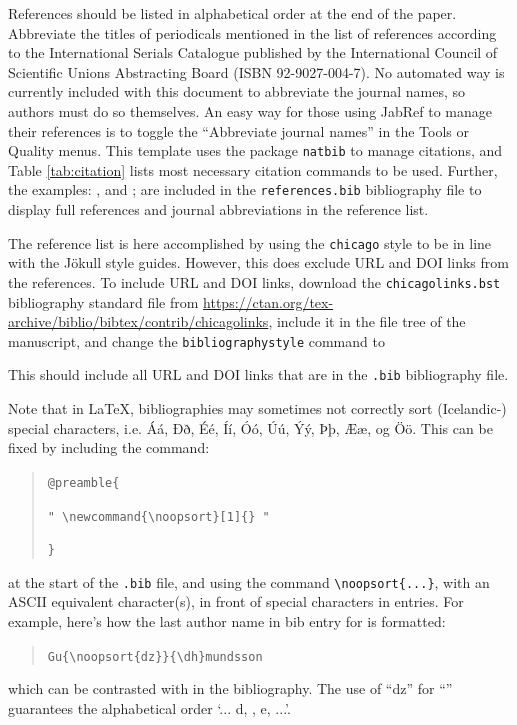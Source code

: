 \documentclass{jokull}
\begin{document}
References should be listed in alphabetical order at the end of the paper. Abbreviate the titles of periodicals mentioned in the list of references according to the International Serials Catalogue published by the International Council of Scientific Unions Abstracting Board (ISBN 92-9027-004-7). No automated way is currently included with this document to abbreviate the journal names, so authors must do so themselves. An easy way for those using JabRef to manage their references is to toggle the ``Abbreviate journal names'' in the Tools or Quality menus. This template uses the package \verb"natbib" to manage citations, and Table \ref{tab:citation} lists most necessary citation commands to be used. Further, the examples: \citep{Adalgeirsdottir_etal_2005}, \citep{Arnadottir_etal_2004} and \citep{Ingolfsson_etal_2016}; are included in the \verb"references.bib" bibliography file to display full references and journal abbreviations in the reference list.

The reference list is here accomplished by using the \verb"chicago" style to be in line with the Jökull style guides. However, this does exclude URL and DOI links from the references. To include URL and DOI links, download the \verb"chicagolinks.bst" bibliography standard file from \url{https://ctan.org/tex-archive/biblio/bibtex/contrib/chicagolinks}, include it in the file tree of the manuscript, and change the \verb"bibliographystyle" command to
\begin{quote}
    \verb""
\end{quote}
This should include all URL and DOI links that are in the \verb".bib" bibliography file.

Note that in \LaTeX, bibliographies may sometimes not correctly sort (Icelandic-) special characters, i.e. Áá, Ðð, Éé, Íí, Óó, Úú, Ýý, Þþ, Ææ, og Öö. This can be fixed by including the command:
\begin{quote}
    \verb|@preamble{|
    
    \verb|" \newcommand{\noopsort}[1]{} " |
    
    \verb|}|
\end{quote}
at the start of the \verb|.bib| file, and using the command \verb|\noopsort{...}|, with an ASCII equivalent character(s), in front of special characters in entries. For example, here's how the last author name in bib entry for \citet{Gudmundsson_etal_2019} is formatted:
\begin{quote}
    \verb|Gu{\noopsort{dz}}{\dh}mundsson|
\end{quote}
which can be contrasted with \citet{Gudmundsson_etal_2007} in the bibliography. The use of ``dz'' for ``{\dh}'' guarantees the alphabetical order `... d, {\dh}, e, ...'.





\end{document}
